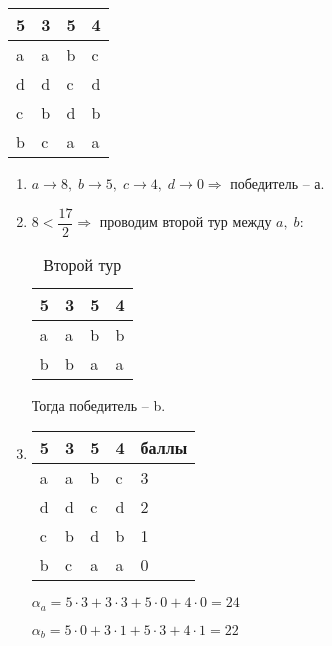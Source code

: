 \begin{example}

	\begin{tabular}{ | l | l | l | l | }
		\hline
			5 & 3 & 5 & 4 \\ \hline
			a & a & b & c \\
			d & d & c & d \\
			c & b & d & b \\
			b & c & a & a \\
		\hline
	\end{tabular}\vspace{0.5cm}
	\begin{enumerate}
		\item $a \rightarrow 8, \; b \rightarrow 5, \; c \rightarrow 4, \; d \rightarrow 0 \Rightarrow $ победитель -- а.
		\item $8 < \dfrac{17}{2} \Rightarrow $ проводим второй тур между $a, \; b:$

		\begin{table}[h!]
		\caption{Второй тур}
		\begin{center}
		\begin{tabular}{ | l | l | l | l | }
			\hline
				5 & 3 & 5 & 4 \\ \hline
				a & a & b & b \\
				b & b & a & a \\
			\hline
		\end{tabular}
		\end{center}
		\end{table}\vspace{0.5cm}

		Тогда победитель -- b.\vspace{0.5cm}

		\item 

		\begin{tabular}{ | l | l | l | l | l | }
		\hline
			5 & 3 & 5 & 4 & баллы\\ \hline
			a & a & b & c & 3 \\
			d & d & c & d & 2 \\
			c & b & d & b & 1 \\
			b & c & a & a & 0 \\
		\hline
		\end{tabular}\vspace{0.5cm}

		$\alpha_a = 5 \cdot 3 + 3 \cdot 3 + 5 \cdot 0 + 4 \cdot 0 = 24$

		$\alpha_b = 5 \cdot 0 + 3 \cdot 1 + 5 \cdot 3 + 4 \cdot 1 = 22$


\end{enumerate}
\end{example}

